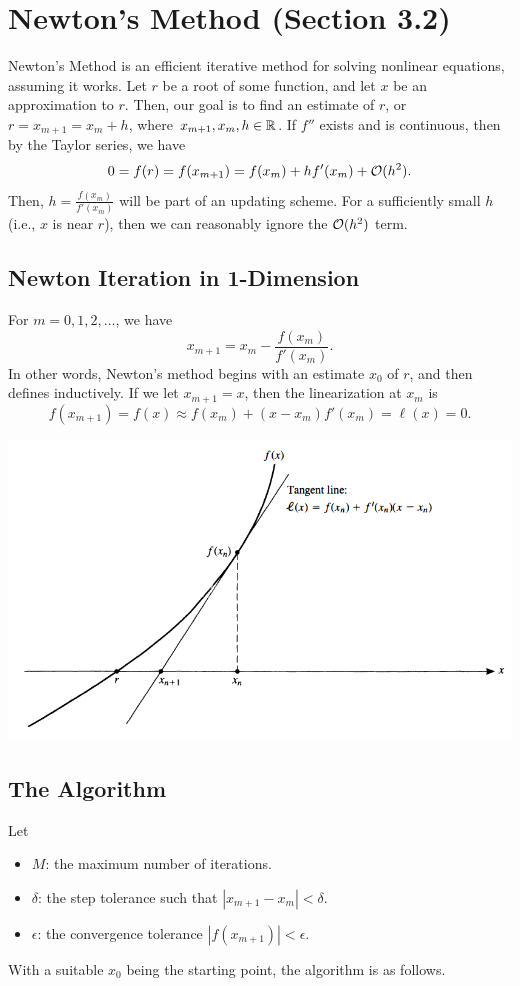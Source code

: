 \documentclass[letterpaper]{article}
\begin{document}
\section{Newton's Method (Section 3.2)}
Newton's Method is an efficient iterative method for solving nonlinear equations, assuming it works. Let $r$ be a root of some function, and let $x$ be an approximation to $r$. Then, our goal is to find an estimate of $r$, or $r = x_{m + 1} = x_m + h$, where $x_{m + 1}, x_m, h \in \mathbb{R}$. If $f''$ exists and is continuous, then by the Taylor series, we have 
\[0 = f(r) = f(x_{m + 1}) = f(x_m) + hf'(x_m) + \mathcal{O}(h^2).\]
Then, $h = \frac{f(x_m)}{f'(x_m)}$ will be part of an updating scheme. For a sufficiently small $h$ (i.e., $x$ is near $r$), then we can reasonably ignore the $\mathcal{O}(h^2)$ term. 

\subsection{Newton Iteration in 1-Dimension}
For $m = 0, 1, 2, \hdots$, we have 
\[x_{m + 1} = x_m - \frac{f(x_m)}{f'(x_m)}.\]
In other words, Newton's method begins with an estimate $x_0$ of $r$, and then defines inductively. If we let $x_{m + 1} = x$, then the linearization at $x_m$ is 
\[f(x_{m + 1}) = f(x) \approx f(x_m) + (x - x_m) f'(x_m) = \ell(x) = 0.\]
\begin{center}
    \includegraphics[scale=0.6]{../assets/geometric_newton.png}
\end{center}

\subsection{The Algorithm}
Let
\begin{itemize}
    \item $M$: the maximum number of iterations. 
    \item $\delta$: the step tolerance such that $|x_{m + 1} - x_m| < \delta$. 
    \item $\epsilon$: the convergence tolerance $|f(x_{m + 1})| < \epsilon$.
\end{itemize}
With a suitable $x_0$ being the starting point, the algorithm is as follows.
\end{document}
